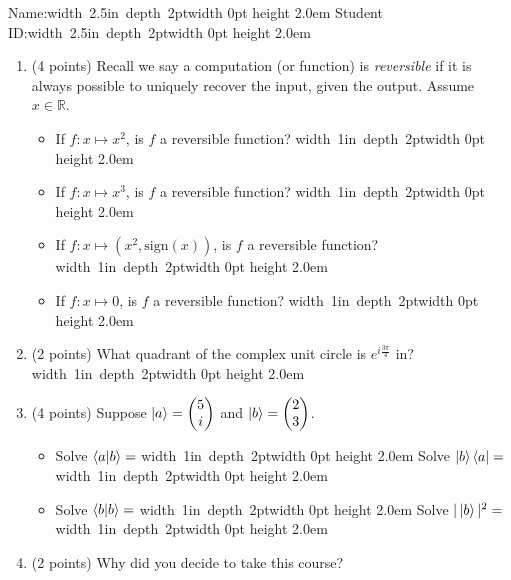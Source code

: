 \documentclass[12pt]{article}
\newcommand{\Blank}{\mbox{\hskip 4pt\vrule width 1in depth 2pt}\vrule width 0pt height 2.0em}
\newcommand{\NameBlank}{\mbox{\hskip 4pt\vrule width 2.5in depth 2pt}\vrule width 0pt height 2.0em}
\begin{document}

\noindent Name:\NameBlank{}   Student ID:\NameBlank{} \newline

\begin{enumerate}[font=\bfseries]
    \item (4 points) Recall we say a computation (or function) is \emph{reversible} if it is always possible to uniquely recover the input, given the output. Assume $x \in \mathbb{R}$.
    \begin{itemize}
        \item If $f : x \mapsto x^2$, is $f$ a reversible function? \Blank{}
        \item If $f : x \mapsto x^3$, is $f$ a reversible function? \Blank{}
        \item If $f : x \mapsto (x^2,\textrm{sign}(x))$, is $f$ a reversible function? \Blank{}
        \item If $f : x \mapsto 0$, is $f$ a reversible function? \Blank{}
    \end{itemize}
    \item (2 points) What quadrant of the complex unit circle is $e^{i\frac{3\pi}{4}}$ in?\Blank{}
    \item (4 points) Suppose $\ket{a} = \begin{pmatrix}5 \\ i \end{pmatrix}$ and $\ket{b} = \begin{pmatrix}2 \\ 3 \end{pmatrix}$.\begin{itemize}
        \item Solve $\braket{a|b} = $ \Blank{} Solve $\ket{b}\bra{a} = $ \Blank{}
        \item Solve $\braket{b|b} = $ \Blank{} Solve $|\ket{b}|^2 = $ \Blank{}
    \end{itemize}
    \item (2 points) Why did you decide to take this course? \newline
    
\end{enumerate}
\end{document}
